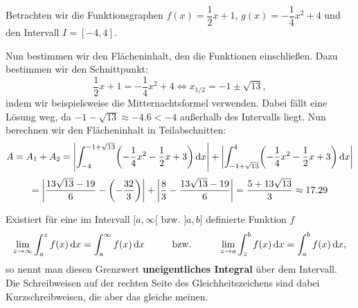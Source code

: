 \documentclass[ngerman, 12pt]{nssheetxea}
\begin{document}
\begin{example}
Betrachten wir die Funktionsgraphen $f(x)=\dfrac{1}{2}x+1$, $g(x)=-\dfrac{1}{4}x^2+4$ und den Intervall $I=[-4,4]$.


\begin{center}
\end{center}
Nun bestimmen wir den Flächeninhalt, den die Funktionen einschließen. Dazu bestimmen wir den Schnittpunkt:
\[ \frac{1}{2}x+1 = -\frac{1}{4}x^2+4 \Leftrightarrow x_{1/2} = -1 \pm \sqrt{13},  \]
indem wir beispielsweise die Mitternachtsformel verwenden. Dabei fällt eine Lösung weg, da $-1-\sqrt{13} \approx -\num{4,6} < -4$ außerhalb des Intervalls liegt. Nun berechnen wir den Flächeninhalt in Teilabschnitten:
\[ A = A_1+A_2 = \mleft| \int_{-4}^{-1+\sqrt{13}} \mleft(-\dfrac{1}{4}x^2-\dfrac{1}{2}x+3 \mright) \diff x \mright| + \mleft| \int_{-1+\sqrt{13}}^{4} \mleft(-\dfrac{1}{4}x^2-\dfrac{1}{2}x+3 \mright) \diff x \mright| \]
\[ = \mleft| \dfrac{13\sqrt{13}-19}{6} - \mleft( - \dfrac{32}{3} \mright)   \mright| + \mleft| \dfrac{8}{3} - \dfrac{13\sqrt{13}-19}{6}  \mright| = \dfrac{5+13\sqrt{13}}{3} \approx \num{17,29}  \]
\end{example}

\begin{definition}
Existiert für eine im Intervall $[a,\infty[$ bzw. $]a,b]$ definierte Funktion $f$
\[ \lim_{z\to \infty} \int_a^zf(x)\mathop{}\!\mathrm{d} x = \int_a^\infty f(x)\mathop{}\!\mathrm{d} x \hspace{1cm} \text{bzw.} \hspace{1cm} \lim_{z\to a} \int_z^bf(x)\mathop{}\!\mathrm{d} x = \int_a^bf(x)\mathop{}\!\mathrm{d} x,\]
so nennt man diesen Grenzwert \textbf{uneigentliches Integral} über dem Intervall. Die Schreibweisen auf der rechten Seite des Gleichheitszeichens sind dabei Kurzschreibweisen, die aber das gleiche meinen.
 
\end{definition}
\end{document}

